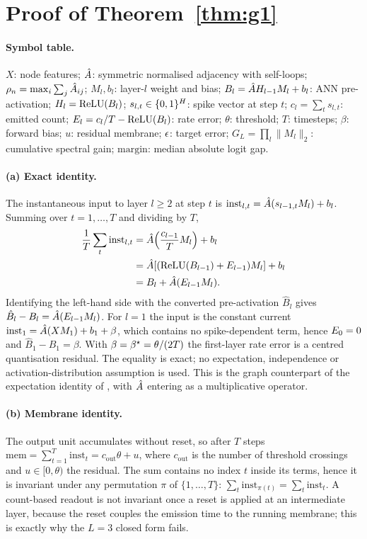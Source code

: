 \section{Proof of Theorem~\ref{thm:g1}}
\label{app:proof}

\paragraph{Symbol table.} $X$: node features; $\hat{A}$: symmetric normalised adjacency with
self-loops; $\rho_n=\max_i\sum_j\hat{A}_{ij}$; $M_l,b_l$: layer-$l$ weight and bias;
$B_l=\hat{A} H_{l-1}M_l+b_l$: ANN pre-activation; $H_l=\operatorname{ReLU}(B_l)$; $s_{l,t}\in\{0,1\}^{H}$:
spike vector at step $t$; $c_l=\sum_t s_{l,t}$: emitted count;
$E_l=c_l/T-\operatorname{ReLU}(B_l)$: rate error; $\theta$: threshold; $T$: timesteps;
$\beta$: forward bias; $u$: residual membrane; $\epsilon$: target error;
$G_L=\prod_l\|M_l\|_2$: cumulative spectral gain; $\mathrm{margin}$: median absolute logit gap.

\paragraph{(a) Exact identity.} The instantaneous input to layer $l\ge 2$ at step $t$ is
$\mathrm{inst}_{l,t}=\hat{A}(s_{l-1,t}M_l)+b_l$. Summing over $t=1,\dots,T$ and dividing by $T$,
\begin{align}
\frac{1}{T}\sum_t \mathrm{inst}_{l,t}
&= \hat{A}\!\left(\frac{c_{l-1}}{T}M_l\right)+b_l \notag\\
&= \hat{A}\!\left[(\operatorname{ReLU}(B_{l-1})+E_{l-1})M_l\right]+b_l \notag\\
&= B_l + \hat{A}(E_{l-1}M_l).
\end{align}
Identifying the left-hand side with the converted pre-activation $\hat{B}_l$ gives
$\hat{B}_l-B_l=\hat{A}(E_{l-1}M_l)$. For $l=1$ the input is the constant current
$\mathrm{inst}_{1}=\hat{A}(XM_1)+b_1+\beta$, which contains no spike-dependent term, hence
$E_0=0$ and $\hat{B}_1-B_1=\beta$. With $\beta=\beta^{\star}=\theta/(2T)$ the first-layer rate
error is a centred quantisation residual. The equality is exact; no expectation, independence or
activation-distribution assumption is used. This is the graph counterpart of the expectation
identity of \cite{tpp2025}, with $\hat{A}$ entering as a multiplicative operator.

\paragraph{(b) Membrane identity.} The output unit accumulates without reset, so after $T$ steps
$\mathrm{mem}=\sum_{t=1}^T \mathrm{inst}_t = c_{\mathrm{out}}\theta+u$, where $c_{\mathrm{out}}$
is the number of threshold crossings and $u\in[0,\theta)$ the residual. The sum contains no
index $t$ inside its terms, hence it is invariant under any permutation $\pi$ of
$\{1,\dots,T\}$:
$\sum_t \mathrm{inst}_{\pi(t)}=\sum_t\mathrm{inst}_t$. A count-based readout is not invariant once
a reset is applied at an intermediate layer, because the reset couples the emission time to the
running membrane; this is exactly why the $L=3$ closed form fails.

